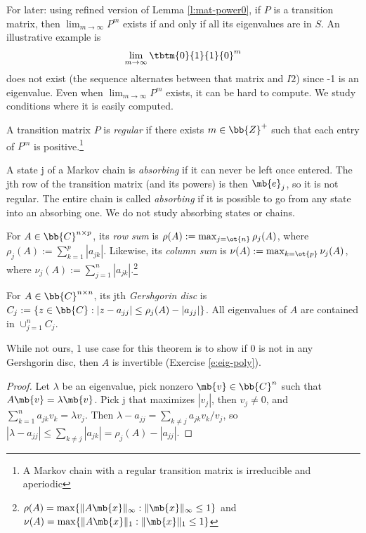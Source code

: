 For later: using refined version of Lemma \ref{l:mat-power0}, if $P$ is a transition matrix, then $\lim_{m \to \infty}P^m$ exists if and only if all its eigenvalues are in $S$. An illustrative example is
\[ \lim_{m \to \infty}\tbtm{0}{1}{1}{0}^m \]
does not exist (the sequence alternates between that matrix and $I 2$) since -1 is an eigenvalue.
Even when $\lim_{m \to \infty}P^m$ exists, it can be hard to compute. We study conditions where it is easily computed.
\begin{defn}
A transition matrix $P$ is \emph{regular} if there exists $m \in \bb{Z}^+$ such that each entry of $P^m$ is positive.\footnote{A Markov chain with a regular transition matrix is irreducible and aperiodic}
\end{defn}
\begin{example}
A state j of a Markov chain is \emph{absorbing} if it can never be left once entered. The jth row of the transition matrix (and its powers) is then $\mb{e}_j$, so it is not regular.
The entire chain is called \emph{absorbing} if it is possible to go from any state into an absorbing one. We do not study absorbing states or chains.
\end{example}
\begin{defn}
For $A \in \bb{C}^{n \times p}$, its \emph{row sum} is $\rho(A):= \max_{j= \ot{n}}\rho_j(A)$, where $\rho_j(A):= \sum_{k=1}^p|a_{jk}|$. Likewise, its \emph{column sum} is $\nu(A):= \max_{k= \ot{p}}\nu_j(A)$, where $\nu_j(A):= \sum_{j=1}^n|a_{jk}|$.\footnote{$\rho(A)= \max \{ \| A \mb{x}\|_\infty : \| \mb{x}\|_\infty \leq 1 \}$ and $\nu(A)= \max \{ \| A \mb{x}\|_1 : \| \mb{x}\|_1 \leq 1 \}$}
\end{defn}
\begin{thm}
For $A \in \bb{C}^{n \times n}$, its jth \emph{Gershgorin disc} is $C_j:= \{ z \in \bb{C}: |z-a_{jj}| \leq \rho_j(A)-|a_{jj}| \}$. All eigenvalues of $A$ are contained in $\cup_{j=1}^nC_j$.
\end{thm}
While not ours, 1 use case for this theorem is to show if 0 is not in any Gershgorin disc, then $A$ is invertible (Exercise \ref{e:eig-poly}).
\begin{proof}%
Let $\lambda$ be an eigenvalue, pick nonzero $\mb{v}\in \bb{C}^n$ such that $A \mb{v}= \lambda \mb{v}$. Pick j that maximizes $|v_j|$, then $v_j \neq 0$, and $\sum_{k=1}^na_{jk}v_k= \lambda v_j$.
Then $\lambda -a_{jj}= \sum_{k \neq j}a_{jk}v_k/v_j$, so $| \lambda -a_{jj}| \leq \sum_{k \neq j}|a_{jk}|= \rho_j(A)- |a_{jj}|$.
\end{proof}
